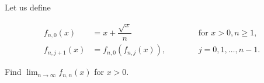 Let us define

$$
\begin{aligned}
   f_{n,0}(x) & = x + \dfrac{\sqrt{x}}{n} & \hspace{1cm} & \text{for } x > 0, n \ge 1, \\
f_{n, j+1}(x) & = f_{n,0}(f_{n,j}(x)),    & \hspace{1cm} & j = 0, 1, \dots, n-1.
\end{aligned}
$$

Find $\displaystyle{\lim_{n \to \infty} f_{n,n}(x)}$ for $x > 0$.
